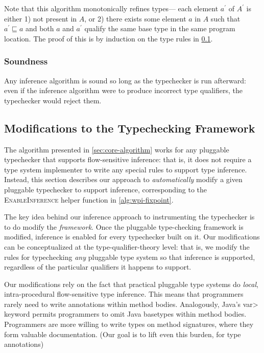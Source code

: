 
Note that this algorithm monotonically refines types---\ie
each element $a^{\prime}$ of $A^{\prime}$ is either 1) not present in $A$, or
2) there exists some element $a$ in $A$ such that $a^{\prime} \sqsubseteq a$
and both $a$ and $a^{\prime}$ qualify the same base type in the same program location.
The proof of this is by induction on the type rules in \cref{sec:instrument}.

\subsubsection{Soundness}
\label{sec:soundness}

Any inference algorithm is sound so long as the typechecker is run afterward:
even if the inference algorithm were to produce incorrect type qualifiers,
the typechecker would reject them.

\subsection{Modifications to the Typechecking Framework}
\label{sec:instrument}

The algorithm presented in \cref{sec:core-algorithm} works for
any pluggable typechecker that supports flow-sensitive inference:
that is, it does not require a type system implementer to write
any special rules to support type inference. Instead, this section
describes our approach to \emph{automatically} modify a given
pluggable typechecker to support inference, corresponding to the
\textsc{Enable\-Inference} helper function in \cref{alg:wpi-fixpoint}.

The key idea behind our inference approach to instrumenting the typechecker
is to do modify the \emph{framework}.  Once the pluggable type-checking
framework is modified, inference is enabled for every typechecker built on it.
Our modifications
can be conceptualized at the type-qualifier-theory level: that is,
we modify the rules for typechecking \emph{any} pluggable type system
so that inference is supported,
regardless of the particular qualifiers it happens to support.

Our modifications rely on the fact that practical pluggable type systems
do \emph{local}, intra-procedural flow-sensitive type inference.
This means that programmers rarely need to write annotations within method bodies.
Analogously, Java's \<var> keyword permits programmers to omit Java basetypes within
method bodies.
Programmers are more willing to write types on method
signatures, where they form valuable documentation.  (Our goal is to lift
even this burden, for type annotations)

